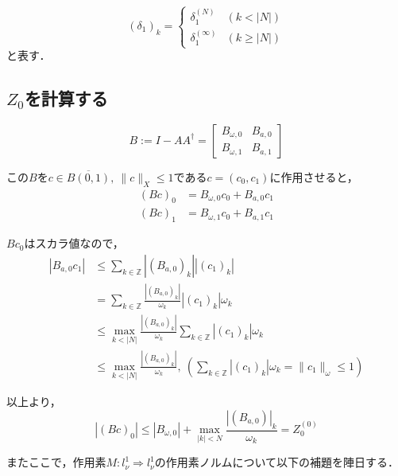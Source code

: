 \documentclass[11pt,a4paper,titlepage]{jsreport}
\theoremstyle{definition}
\begin{document}
\begin{equation*}
  \left( \delta_1 \right)_k = \begin{cases}
    \delta_1^{(N)}      & (k<|N|)      \\
    \delta_1^{(\infty)} & (k \geq |N|)
  \end{cases}
\end{equation*}
と表す．

\subsection{$Z_0$を計算する}
\begin{equation*}
  B := I - AA^\dagger = \begin{bmatrix}
    B_{\omega,0} & B_{a,0} \\
    B_{\omega,1} & B_{a,1}
  \end{bmatrix}
\end{equation*}

この$Bをc\in \overline{B(0,1)},\ \|c\|_X \leq 1$である$c=(c_0,c_1)$に作用させると，
\begin{align*}
  (Bc)_0 & = B_{\omega,0} c_0 + B_{a,0} c_1 \\
  (Bc)_1 & = B_{\omega,1} c_0 + B_{a,1} c_1
\end{align*}

$Bc_0$はスカラ値なので，
\begin{align*}
  \left| B_{a,0}c_1 \right| & \leq \sum_{k \in \mathbb{Z}} \left|(B_{a,0})_k\right| \left|(c_1)_k \right|                                                            \\
                            & = \sum_{k \in \mathbb{Z}} \frac{|(B_{a,0})_k|}{\omega_k} |(c_1)_k| \omega_k                                                            \\
                            & \leq \max_{k < |N|} \frac{|(B_{a,0})_k|}{\omega_k} \sum_{k \in \mathbb{Z}} |(c_1)_k| \omega_k                                          \\
                            & \leq \max_{k < |N|} \frac{|(B_{a,0})_k|}{\omega_k},\ \left( \sum_{k \in \mathbb{Z}} |(c_1)_k| \omega_k = \|c_1\|_\omega \leq 1 \right)
\end{align*}

以上より，
\begin{equation*}
  |(Bc)_0| \leq |B_{\omega,0}| + \max_{|k| < N} \frac{|(B_{a,0})|_k}{\omega_k} = Z_0^{(0)}
\end{equation*}

またここで，作用素$M:l_\nu^1 \Rightarrow l_\nu^1 $の作用素ノルムについて以下の補題を陣日する．
\end{document}
